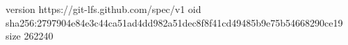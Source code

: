version https://git-lfs.github.com/spec/v1
oid sha256:2797904e84e3c44ca51ad4dd982a51dec8f8f41cd49485b9e75b54668290ce19
size 262240

